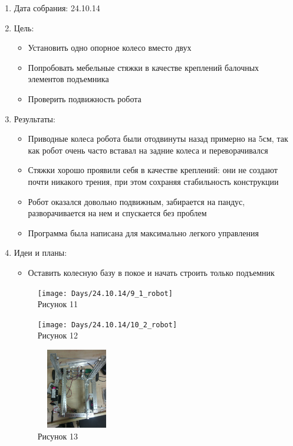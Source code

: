 
	\begin{enumerate}
		\item Дата собрания: 24.10.14
		\item Цель:
		\begin{itemize}
			\item Установить одно опорное колесо вместо двух
			\item Попробовать мебельные стяжки в качестве креплений балочных элементов подъемника
			\item Проверить подвижность робота
		\end{itemize}			
		\item Результаты:
		\begin{itemize}
			\item Приводные колеса робота были отодвинуты назад примерно на 5см, так как робот очень часто вставал на задние колеса и переворачивался
			\item Стяжки хорошо проявили себя в качестве креплений: они не создают почти никакого трения, при этом сохраняя стабильность конструкции
			\item Робот оказался довольно подвижным, забирается на пандус, разворачивается на нем и спускается без проблем
			\item Программа была написана для максимально легкого управления
		\end{itemize}
		\item Идеи и планы:
		\begin{itemize}
			\item Оставить колесную базу в покое и начать строить только подъемник
		\end{itemize}
		\begin{figure} [h]
			\centering
			\begin{minipage}{0.3\linewidth}
				\texttt{[image: Days/24.10.14/9\_1\_robot]}\\ Рисунок 11
			\end{minipage}
			\begin{minipage}{0.3\linewidth}
				\texttt{[image: Days/24.10.14/10\_2\_robot]}\\ Рисунок 12
			\end{minipage}
			\begin{minipage}{0.3\linewidth}
				\includegraphics[width=35mm,height=35mm]{Days/24.10.14/9_4_robot}\\ Рисунок 13
			\end{minipage}
		\end{figure}
	\end{enumerate}
\newpage